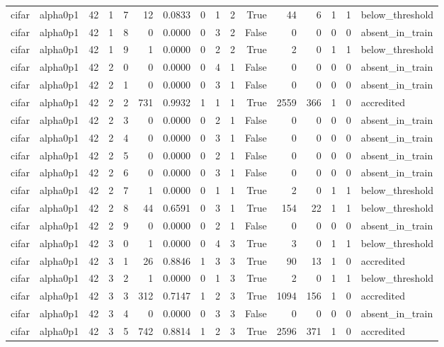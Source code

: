 \begin{tabular}{llrrrrrrrrrrrrrl}
cifar & alpha0p1 & 42 & 1 & 7 & 12 & 0.0833 & 0 & 1 & 2 & True & 44 & 6 & 1 & 1 & below\_threshold \\
cifar & alpha0p1 & 42 & 1 & 8 & 0 & 0.0000 & 0 & 3 & 2 & False & 0 & 0 & 0 & 0 & absent\_in\_train \\
cifar & alpha0p1 & 42 & 1 & 9 & 1 & 0.0000 & 0 & 2 & 2 & True & 2 & 0 & 1 & 1 & below\_threshold \\
cifar & alpha0p1 & 42 & 2 & 0 & 0 & 0.0000 & 0 & 4 & 1 & False & 0 & 0 & 0 & 0 & absent\_in\_train \\
cifar & alpha0p1 & 42 & 2 & 1 & 0 & 0.0000 & 0 & 3 & 1 & False & 0 & 0 & 0 & 0 & absent\_in\_train \\
cifar & alpha0p1 & 42 & 2 & 2 & 731 & 0.9932 & 1 & 1 & 1 & True & 2559 & 366 & 1 & 0 & accredited \\
cifar & alpha0p1 & 42 & 2 & 3 & 0 & 0.0000 & 0 & 2 & 1 & False & 0 & 0 & 0 & 0 & absent\_in\_train \\
cifar & alpha0p1 & 42 & 2 & 4 & 0 & 0.0000 & 0 & 3 & 1 & False & 0 & 0 & 0 & 0 & absent\_in\_train \\
cifar & alpha0p1 & 42 & 2 & 5 & 0 & 0.0000 & 0 & 2 & 1 & False & 0 & 0 & 0 & 0 & absent\_in\_train \\
cifar & alpha0p1 & 42 & 2 & 6 & 0 & 0.0000 & 0 & 3 & 1 & False & 0 & 0 & 0 & 0 & absent\_in\_train \\
cifar & alpha0p1 & 42 & 2 & 7 & 1 & 0.0000 & 0 & 1 & 1 & True & 2 & 0 & 1 & 1 & below\_threshold \\
cifar & alpha0p1 & 42 & 2 & 8 & 44 & 0.6591 & 0 & 3 & 1 & True & 154 & 22 & 1 & 1 & below\_threshold \\
cifar & alpha0p1 & 42 & 2 & 9 & 0 & 0.0000 & 0 & 2 & 1 & False & 0 & 0 & 0 & 0 & absent\_in\_train \\
cifar & alpha0p1 & 42 & 3 & 0 & 1 & 0.0000 & 0 & 4 & 3 & True & 3 & 0 & 1 & 1 & below\_threshold \\
cifar & alpha0p1 & 42 & 3 & 1 & 26 & 0.8846 & 1 & 3 & 3 & True & 90 & 13 & 1 & 0 & accredited \\
cifar & alpha0p1 & 42 & 3 & 2 & 1 & 0.0000 & 0 & 1 & 3 & True & 2 & 0 & 1 & 1 & below\_threshold \\
cifar & alpha0p1 & 42 & 3 & 3 & 312 & 0.7147 & 1 & 2 & 3 & True & 1094 & 156 & 1 & 0 & accredited \\
cifar & alpha0p1 & 42 & 3 & 4 & 0 & 0.0000 & 0 & 3 & 3 & False & 0 & 0 & 0 & 0 & absent\_in\_train \\
cifar & alpha0p1 & 42 & 3 & 5 & 742 & 0.8814 & 1 & 2 & 3 & True & 2596 & 371 & 1 & 0 & accredited \\

\end{tabular}
